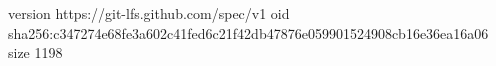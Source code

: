 version https://git-lfs.github.com/spec/v1
oid sha256:c347274e68fe3a602c41fed6c21f42db47876e059901524908cb16e36ea16a06
size 1198
